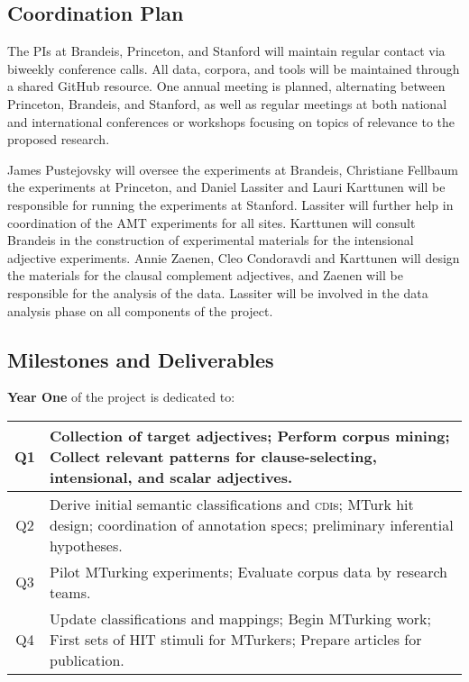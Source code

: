 \documentclass[10pt]{article}
\begin{document}
\vspace {-3mm}
\subsection{Coordination Plan}
\vspace {-2mm}

The PIs at Brandeis, Princeton, and Stanford will maintain regular contact via biweekly  conference calls. 
All data, corpora, and tools will be maintained through a shared GitHub resource. 
One annual meeting is planned, alternating between Princeton, Brandeis, and Stanford, as well as regular meetings at both national and international conferences or workshops focusing on topics of relevance to the proposed research. 

James Pustejovsky will oversee the experiments at Brandeis, Christiane Fellbaum the experiments at Princeton, and Daniel Lassiter and Lauri Karttunen will be responsible for running the experiments at Stanford.  Lassiter will further help in coordination of the AMT experiments for all sites.  Karttunen will consult Brandeis in the construction of experimental materials for the intensional adjective experiments.  Annie Zaenen, Cleo Condoravdi and  Karttunen will design the materials for the clausal complement adjectives, and Zaenen will be responsible for the analysis of the data.  Lassiter will be involved in the data analysis phase on all components of the project. 


\vspace {-2mm}
\vspace {-2mm}


\subsection{Milestones and Deliverables}
\vspace {-1mm}


{\bf Year One} of the project is dedicated to: 

\vspace{1mm}\noindent
{\small
\begin{tabularx}{470pt}{|c|X|}

\hline

Q1 & Collection of target adjectives; Perform corpus mining;  Collect relevant patterns for clause-selecting, intensional, and scalar adjectives. 
\\
\hline

Q2 & Derive initial semantic classifications and \textsc{cdi}s; MTurk hit design; coordination of annotation specs; preliminary inferential hypotheses.
\\

\hline

Q3 & Pilot MTurking experiments;  Evaluate corpus data by research teams.    \\

\hline

Q4 & Update classifications and mappings; Begin MTurking work; First sets of HIT stimuli for MTurkers; Prepare articles for publication.     \\

\hline

\end{tabularx}
}
\end{document}
